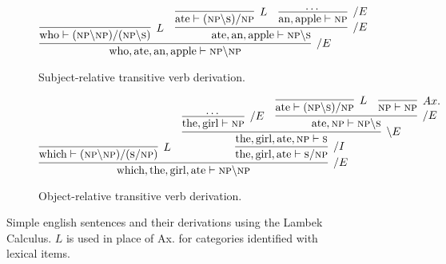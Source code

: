 \begin{figure}
     \begin{subfigure}[b]{1\textwidth}
         \centering
		\[
		\infer[/E]{\text{who}, \text{ate}, \text{an}, \text{apple} \vdash \textsc{np}\backslash \textsc{np}}{
			\infer[L]{\text{who} \vdash (\textsc{np} \backslash \textsc{np}) / (\textsc{np} \backslash \textsc{s})}{}
			&
			\infer[/E]{\text{ate}, \text{an}, \text{apple} \vdash \textsc{np}\backslash \textsc{s}}{
				\infer[L]{\text{ate} \vdash (\textsc{np}\backslash \textsc{s})/\textsc{np}}{}
				&
				\infer[/E]{\text{an}, \text{apple} \vdash \textsc{np}}{\dots}
			}
		}
		\]
         \caption{Subject-relative transitive verb derivation.}
	\end{subfigure}
	\begin{subfigure}[b]{1\textwidth}
         \centering
		\[
		\infer[/E]{\text{which}, \text{the}, \text{girl}, \text{ate} \vdash \textsc{np}\backslash \textsc{np}}{
			\infer[L]{\text{which} \vdash (\textsc{np} \backslash \textsc{np}) / (\textsc{s} / \textsc{np})}{}
			&
			\infer[/I]{\text{the}, \text{girl}, \text{ate} \vdash \textsc{s}/ \textsc{np}}{
				\infer[\backslash E]{\text{the}, \text{girl}, \text{ate}, \textsc{np} \vdash \textsc{s}}{
					\infer[/E]{\text{the}, \text{girl} \vdash \textsc{np}}{\dots}
					&
					\infer[/E]{\text{ate}, \textsc{np} \vdash \textsc{np} \backslash \textsc{s}}{
						\infer[L]{\text{ate} \vdash (\textsc{np} \backslash \textsc{s})/\textsc{np}}{}
						&
						\infer[Ax.]{\textsc{np} \vdash \textsc{np}}{}
					}
				}
			}
		}
		\]
        \caption{Object-relative transitive verb derivation.}
		\label{fig:lambek_en:obj}
     \end{subfigure}
     \caption[English Lambek Derivations]{Simple english sentences and their derivations using the Lambek Calculus. $L$ is used in place of Ax. for categories identified with lexical items.}
     \label{fig:lambek_en}
\end{figure}

